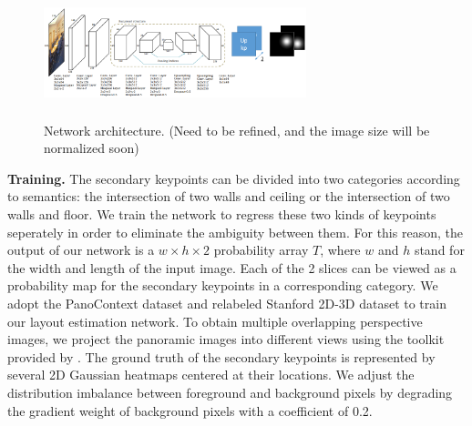 \begin{figure}
	\includegraphics[height=1.5in, width=3in]{figs/network.png}
	\caption{Network architecture. (Need to be refined, and the image size will be normalized soon)}
	\label{fig:network}
\end{figure}

\noindent\textbf{Training.} The secondary keypoints can be divided into two categories according to semantics: the intersection of two walls and ceiling or the intersection of two walls and floor. We train the network to regress these two kinds of keypoints seperately in order to eliminate the ambiguity between them. For this reason, the output of our network is a $w \times h \times 2$ probability array $T$, where $w$ and $h$ stand for the width and length of the input image. Each of the 2 slices can be viewed as a probability map for the secondary keypoints in a corresponding category. We adopt the PanoContext dataset \cite{pano} and relabeled Stanford 2D-3D dataset \cite{layoutnet} to train our layout estimation network. To obtain multiple overlapping perspective images, we project the panoramic images into different views using the toolkit provided by \cite{pano}. The ground truth of the secondary keypoints is represented by several 2D Gaussian heatmaps centered at their locations. We adjust the distribution imbalance between foreground and background pixels by degrading the gradient weight of background pixels with a coefficient of 0.2.



